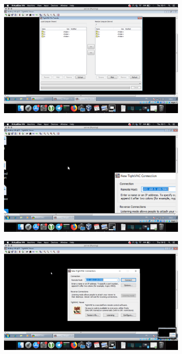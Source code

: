 \documentclass[
	a4paper,
	oneside,
	BCOR = 10mm,
	DIV = 12,
	12pt,
	headings = normal,
]{scrartcl}
\begin{document}
			\begin{figure}[!htbp]
				\centering
				\begin{subfigure}[b]{\columnwidth}
					\centering
					\includegraphics[height = 10\baselineskip]{./assets/p13-01.png}
					\caption{}
					\label{subfig:04-tightvnc-05-01}
				\end{subfigure}
				\begin{subfigure}[b]{\columnwidth}
					\centering
					\includegraphics[height = 10\baselineskip]{./assets/p13-02.png}
					\caption{}
					\label{subfig:04-tightvnc-05-02}
				\end{subfigure}
				\begin{subfigure}[b]{\columnwidth}
					\centering
					\includegraphics[height = 10\baselineskip]{./assets/p13-03.png}

\end{subfigure}
\end{figure}
\end{document}
